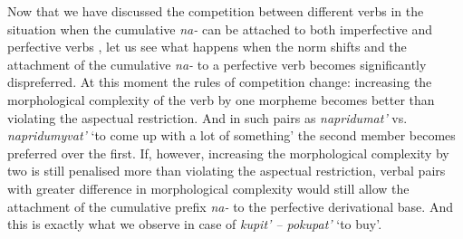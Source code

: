 Now that we have discussed the competition between different verbs in the situation when the cumulative  \textit{na-}   can be attached to both imperfective and perfective verbs , let us see what happens when the norm shifts and the attachment of the cumulative  \textit{na-}   to a perfective verb  becomes significantly dispreferred. At this moment the rules of competition change: increasing the morphological complexity of the verb by one morpheme becomes better than violating the aspectual restriction. And in such pairs as \textit{napridumat'} vs. \textit{napridumyvat'} `to come up with a lot of something' the second member becomes preferred over the first. If, however, increasing the morphological complexity by two is still penalised more than violating the aspectual restriction, verbal pairs with greater difference in morphological complexity would still allow the attachment of the cumulative  prefix \textit{na-}   to the perfective derivational base. And this is exactly what we observe in case of \textit{kupit' -- pokupat'} `to buy'.

